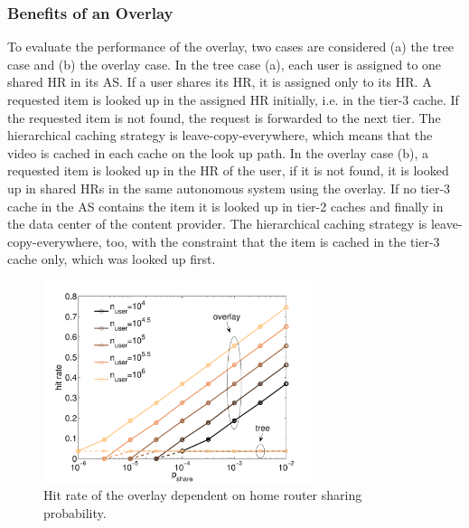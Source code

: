 \subsubsection{Benefits of an Overlay}

To evaluate the performance of the overlay, two cases are considered (a) the tree case and (b) the overlay case. In the tree case (a), each user is assigned to one shared HR in its AS. If a user shares its HR, it is assigned only to its HR. A requested item is looked up in the assigned HR initially, i.e. in the tier-3 cache. If the requested item is not found, the request is forwarded to the next tier. The hierarchical caching strategy is leave-copy-everywhere, which means that the video is cached in each cache on the look up path. In the overlay case (b), a requested item is looked up in the HR of the user, if it is not found, it is looked up in shared HRs in the same autonomous system using the overlay. If no tier-3 cache in the AS contains the item it is looked up in tier-2 caches and finally in the data center of the content provider. The hierarchical caching strategy is leave-copy-everywhere, too, with the constraint that the item is cached in the tier-3 cache only, which was looked up first.

\begin{figure}[tb]
  \centering
  \includegraphics[width=0.7\textwidth]{hierarchical/simulative/figures/overlay_nuser_hitrate3}
  \caption{Hit rate of the overlay dependent on home router sharing probability.}
  \label{fig:overlay_nuser_hitrate}
\end{figure}

